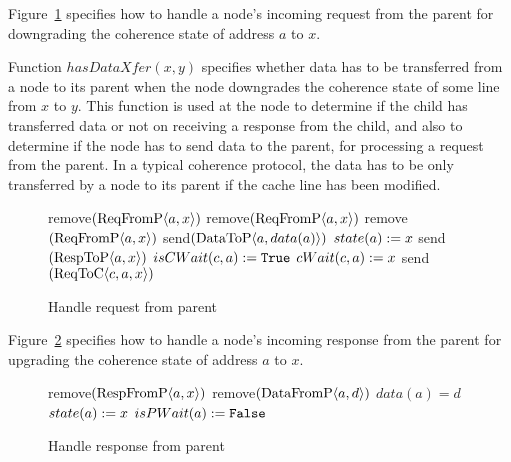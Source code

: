 Figure~\ref{alg:handlePReq} specifies how to handle a node's incoming request
from the parent for downgrading the coherence state of address $a$ to $x$.

Function $hasDataXfer(x, y)$ specifies whether data has to be transferred
from a node to its parent when the node downgrades the coherence state of some
line from $x$ to $y$.  This function is used at the node to determine if the
child has transferred data or not on receiving a response from the child, and
also to determine if the node has to send data to the parent, for processing a
request from the parent. In a typical coherence protocol, the data has to be
only transferred by a node to its parent if the cache line has been modified.


\begin{figure}
\begin{algorithmic}
  \State remove$(\text{ReqFromP$\langle a,x\rangle$})$
     \State remove$(\text{ReqFromP$\langle a,x\rangle$})$
     \State remove$(\text{ReqFromP$\langle a,x\rangle$})$
        \State send$(\text{DataToP$\langle a,data(a)\rangle$})$
     \EndIf
     \State $state(a) := x$
     \State send$(\text{RespToP$\langle a,x\rangle$})$
  \Else
           \State $isCWait(c, a) := \texttt{True}$
           \State $cWait(c, a) := x$
           \State send$(\text{ReqToC$\langle c,a,x\rangle$})$
        \EndIf
     \EndFor
  \EndIf
\EndIf
\EndFunction
\end{algorithmic}
\caption{Handle request from parent}
\label{alg:handlePReq}
\end{figure}

Figure~\ref{alg:handlePResp} specifies how to handle a node's incoming response
from the parent for upgrading the coherence state of address $a$ to $x$.

\begin{figure}
\begin{algorithmic}
  \State remove$(\text{RespFromP$\langle a,x\rangle$})$
     \State remove$(\text{DataFromP$\langle a,d\rangle$})$
     \State $data(a) = d$
  \EndIf
  \State $state(a) := x$
  \State $isPWait(a) := \texttt{False}$ 
\EndFunction
\end{algorithmic}
\caption{Handle response from parent}
\label{alg:handlePResp}
\end{figure}

